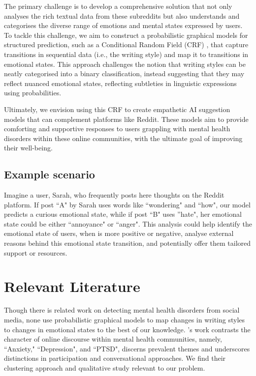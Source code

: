 \documentclass[conference,compsoc]{IEEEtran}
\begin{document}
The primary challenge is to develop a comprehensive solution that not only analyses the rich textual data from these subreddits but also understands and categorises the diverse range of emotions and mental states expressed by users. To tackle this challenge, we aim to construct a probabilistic graphical models for structured prediction, such as a Conditional Random Field (CRF) \citep{Lafferty+01:CRF}, that capture transitions in sequential data (i.e., the writing style) and map it to transitions in emotional states. This approach challenges the notion that writing styles can be neatly categorised into a binary classification, instead suggesting that they may reflect nuanced emotional states, reflecting subtleties in linguistic expressions using probabilities. 

Ultimately, we envision using this CRF to create empathetic AI suggestion models that can complement platforms like Reddit. These models aim to provide comforting and supportive responses to users grappling with mental health disorders within these online communities, with the ultimate goal of improving their well-being.

\subsection{Example scenario}
Imagine a user, Sarah, who frequently posts here thoughts on the Reddit platform. If post ``A" by Sarah uses words like ``wondering" and ``how", our model predicts a curious emotional state, while if post ``B" uses ''hate", her emotional state could be either ``annoyance" or ``anger". This analysis could help identify the emotional state of users, when is more positive or negative, analyse external reasons behind this emotional state transition, and  potentially offer them tailored support or resources.

\section{Relevant Literature}
Though there is related work on detecting mental health disorders from social media, none use probabilistic graphical models to map changes in writing styles to changes in emotional states to the best of our knowledge. \citet{Park+18:mental-health-reddit}'s work contrasts the character of online discourse within mental health communities, namely, ``Anxiety," ``Depression", and ``PTSD", discerns prevalent themes and underscores distinctions in participation and conversational approaches. We find their clustering approach and qualitative study relevant to our problem. 
\end{document}
